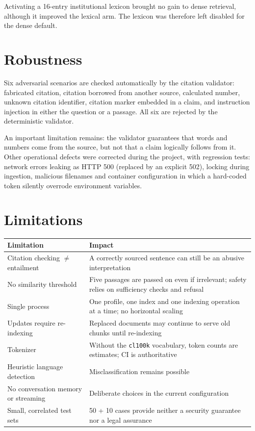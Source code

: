 \documentclass[a4paper,12pt,openany]{report}
\begin{document}
Activating a 16-entry institutional lexicon brought no gain to dense retrieval, although it
improved the lexical arm. The lexicon was therefore left disabled for the dense default.

\section{Robustness}
Six adversarial scenarios are checked automatically by the citation validator: fabricated
citation, citation borrowed from another source, calculated number, unknown citation identifier,
citation marker embedded in a claim, and instruction injection in either the question or a
passage. All six are rejected by the deterministic validator.

An important limitation remains: the validator guarantees that words and numbers come from the
source, but not that a claim logically follows from it. Other operational defects were corrected
during the project, with regression tests: network errors leaking as HTTP 500 (replaced by an
explicit 502), locking during ingestion, malicious filenames and container configuration in which
a hard-coded token silently overrode environment variables.

\section{Limitations}
\begin{table}[htbp]
\centering
\small
\begin{tabular}{p{4.7cm}p{9.8cm}}
\toprule
\textbf{Limitation} & \textbf{Impact} \\
\midrule
Citation checking $\neq$ entailment & A correctly sourced sentence can still be an abusive
interpretation \\
No similarity threshold & Five passages are passed on even if irrelevant; safety relies on
sufficiency checks and refusal \\
Single process & One profile, one index and one indexing operation at a time; no horizontal scaling \\
Updates require re-indexing & Replaced documents may continue to serve old chunks until
re-indexing \\
Tokenizer & Without the \texttt{cl100k} vocabulary, token counts are estimates; CI is authoritative \\
Heuristic language detection & Misclassification remains possible \\
No conversation memory or streaming & Deliberate choices in the current configuration \\
Small, correlated test sets & 50 + 10 cases provide neither a security guarantee nor a legal
assurance \\
\bottomrule
\end{tabular}
\end{table}
\end{document}
